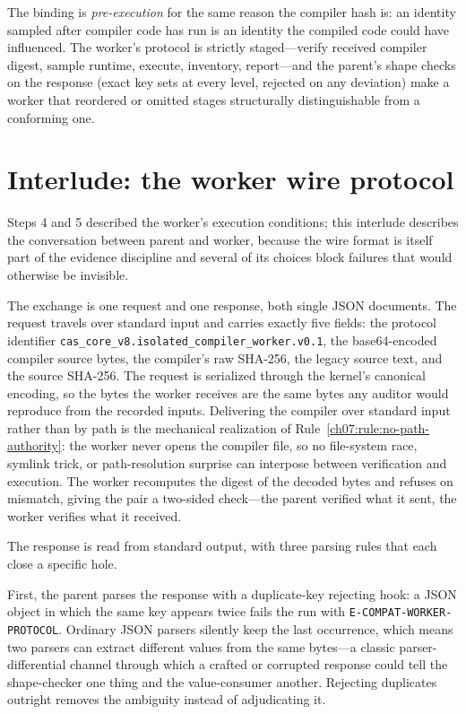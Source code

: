 The binding is \emph{pre-execution} for the same reason the compiler hash is: an identity sampled after compiler code has run is an identity the compiled code could have influenced. The worker's protocol is strictly staged---verify received compiler digest, sample runtime, execute, inventory, report---and the parent's shape checks on the response (exact key sets at every level, rejected on any deviation) make a worker that reordered or omitted stages structurally distinguishable from a conforming one.

\section{Interlude: the worker wire protocol}\label{ch07:wire}

Steps 4 and 5 described the worker's execution conditions; this interlude describes the conversation between parent and worker, because the wire format is itself part of the evidence discipline and several of its choices block failures that would otherwise be invisible.

The exchange is one request and one response, both single JSON documents. The request travels over standard input and carries exactly five fields: the protocol identifier \texttt{cas\_core\_v8.isolated\_compiler\_worker.v0.1}, the base64-encoded compiler source bytes, the compiler's raw SHA-256, the legacy source text, and the source SHA-256. The request is serialized through the kernel's canonical encoding, so the bytes the worker receives are the same bytes any auditor would reproduce from the recorded inputs. Delivering the compiler over standard input rather than by path is the mechanical realization of Rule~\ref{ch07:rule:no-path-authority}: the worker never opens the compiler file, so no file-system race, symlink trick, or path-resolution surprise can interpose between verification and execution. The worker recomputes the digest of the decoded bytes and refuses on mismatch, giving the pair a two-sided check---the parent verified what it sent, the worker verifies what it received.

The response is read from standard output, with three parsing rules that each close a specific hole.

First, the parent parses the response with a duplicate-key rejecting hook: a JSON object in which the same key appears twice fails the run with \texttt{E-COMPAT-WORKER-PROTOCOL}. Ordinary JSON parsers silently keep the last occurrence, which means two parsers can extract different values from the same bytes---a classic parser-differential channel through which a crafted or corrupted response could tell the shape-checker one thing and the value-consumer another. Rejecting duplicates outright removes the ambiguity instead of adjudicating it.

